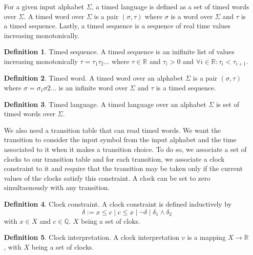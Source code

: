 \documentclass[12pt]{article}
\theoremstyle{definition}
\newtheorem{definition}{Definition}[section]
\theoremstyle{definition}
\theoremstyle{remark}
\newcommand{\R}{\mathbb{R}}
\newcommand{\Q}{\mathbb{Q}}
\begin{document}
For a given input alphabet $\Sigma$, a timed language is defined as a set of timed words over $\Sigma$. A timed word over $\Sigma$ is a pair $(\sigma, \tau)$ where $\sigma$ is a word over $\Sigma$ and $\tau$ is a timed sequence. Lastly, a timed sequence is a sequence of real time values increasing monotonically.~\cite{ALUR1994183}

\theoremstyle{definition}
\begin{definition}{Timed sequence.}
A timed sequence is an inifinite list of values increasing monotonically $\tau = \tau_1 \tau_2 ...$ where $\tau \in \R$ and $\tau_i > 0$ and $\forall i \in \R: \tau_i < \tau_{i+1}$.
\end{definition}

\theoremstyle{definition}
\begin{definition}{Timed word.}
A timed word over an alphabet $\Sigma$ is a pair $(\sigma, \tau)$ where $\sigma = \sigma_1 \sigma2 ...$ is an infinite word over $\Sigma$ and $\tau$ is a timed sequence.
\end{definition}

\theoremstyle{definition}
\begin{definition}{Timed language.}
A timed language over an alphabet $\Sigma$ is set of timed words over $\Sigma$.
\end{definition}

We also need a transition table that can read timed words. We want the transition to consider the input symbol from the input alphabet and the time associated to it when it makes a transition choice. To do so, we associate a set of clocks to our transition table and for each transition, we associate a clock constraint to it and require that the transition may be taken only if the current values of the clocks satisfy this constraint. A clock can be set to zero simultaenously with any transition.

\theoremstyle{definition}
\begin{definition}{Clock constraint.} A clock constraint is defined inductively by
$$\delta := x \le c \mid c \le x \mid \neg \delta \mid \delta_1 \land \delta_2$$ with $x \in X$ and $c \in \Q$. $X$ being a set of cloks.
\end{definition}

\theoremstyle{definition}
\begin{definition}{Clock interpretation.} A clock interpretation $v$ is a mapping $X \to \R$, with $X$ being a set of clocks.
\end{definition}
\end{document}
